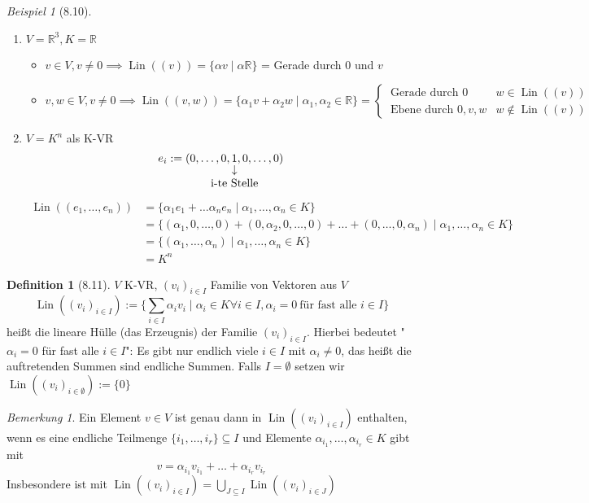 \documentclass[a4paper]{scrartcl}
\DeclareMathOperator{\Forall}{\forall}
\DeclareMathOperator{\Lin}{Lin}
\theoremstyle{definition}
\newtheorem{defn}{Definition}
\theoremstyle{plain}
\theoremstyle{plain}
\theoremstyle{remark}
\newtheorem{remark}{Bemerkung}
\theoremstyle{remark}
\theoremstyle{remark}
\theoremstyle{remark}
\theoremstyle{remark}
\newtheorem{ex}{Beispiel}
\begin{document}
\begin{ex}[8.10]
\mbox{}
\begin{enumerate}
\item $V = \mathbb{R}^3, K = \mathbb{R}$
\begin{itemize}
\item $v \in V, v \neq 0 \implies \Lin((v)) = \{\alpha v \mid \alpha \mathbb{R}\}$ = Gerade durch $0$ und $v$
\item \[v,w \in V, v \neq 0 \implies \Lin((v,w)) = \{\alpha_1 v + \alpha_2 w \mid \alpha_1, \alpha_2 \in \mathbb{R}\} = \begin{cases} ~\text{Gerade durch $0$} & w \in \Lin((v)) \\ ~\text{Ebene durch $0,v,w$} & w\not\in \Lin((v)) \end{cases}\]
\end{itemize}
\item $V = K^n$ als K-VR \\
         \[e_i := (0, \ldots, 0, \underarrow[1]{i-te Stelle}, 0, \ldots, 0)\]
\begin{align*}
\Lin((e_1, \ldots, e_n)) &= \{\alpha_1 e_1 + \ldots \alpha_n e_n \mid \alpha_1, \ldots, \alpha_n \in K \} \\
&= \{(\alpha_1, 0, \ldots, 0) + (0, \alpha_2, 0, \ldots, 0) + \ldots + (0, \ldots, 0, \alpha_n) \mid \alpha_1, \ldots, \alpha_n \in K\} \\
&= \{(\alpha_1, \ldots, \alpha_n) \mid \alpha_1, \ldots, \alpha_n \in K\} \\
&= K^n
\end{align*}
\end{enumerate}
\end{ex}
\begin{defn}[8.11]
$V$ K-VR, $(v_i)_{i\in I}$ Familie von Vektoren aus $V$
\[\Lin((v_i)_{i \in I}) := \{\sum_{i\in I} \alpha_i v_i \mid \alpha_i \in K \Forall i\in I, \alpha_i = 0 ~\text{für fast alle $i\in I$}\}\]
heißt die lineare Hülle (das Erzeugnis) der Familie $(v_i)_{i \in I}$. Hierbei bedeutet "$\alpha_i = 0$ für fast alle $i\in I$": Es gibt nur endlich viele $i\in I$ mit $\alpha_i \neq 0$,
das heißt die auftretenden Summen sind endliche Summen. Falls $I = \emptyset$ setzen wir $\Lin((v_i)_{i\in\emptyset}) := \{0\}$
\end{defn}
\begin{remark}
Ein Element $v \in V$ ist genau dann in $\Lin((v_i)_{i\in I})$ enthalten, wenn es eine endliche Teilmenge $\{i_1, \ldots, i_r\} \subseteq I$ und Elemente $\alpha_{i_1}, \ldots, \alpha_{i_r} \in K$ gibt mit
\[v = \alpha_{i_1} v_{i_1} + \ldots + \alpha_{i_r} v_{i_r}\]
Insbesondere ist mit $\Lin((v_i)_{i\in I}) = \bigcup_{J\subseteq I} \Lin((v_i)_{i\in J})$
\end{remark}
\end{document}
